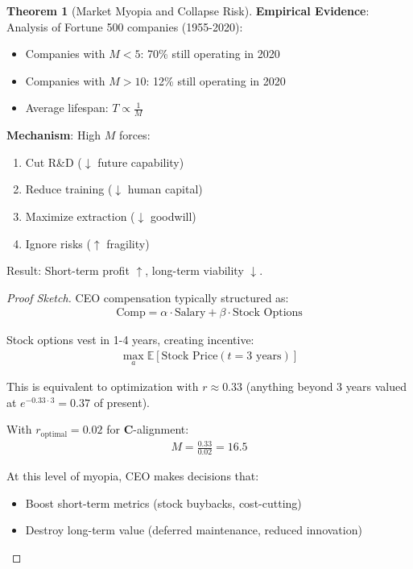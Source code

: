 \documentclass[11pt,a4paper]{article}
\theoremstyle{definition}
\newtheorem{theorem}{Theorem}[section]
\theoremstyle{remark}
\begin{document}
\begin{enumerate}
\begin{theorem}[Market Myopia and Collapse Risk]
\textbf{Empirical Evidence}: Analysis of Fortune 500 companies (1955-2020):
\begin{itemize}
    \item Companies with \(M < 5\): 70\% still operating in 2020
    \item Companies with \(M > 10\): 12\% still operating in 2020
    \item Average lifespan: \(T \propto \frac{1}{M}\)
\end{itemize}

\textbf{Mechanism}: High \(M\) forces:
\begin{enumerate}
    \item Cut R\&D (\(\downarrow\) future capability)
    \item Reduce training (\(\downarrow\) human capital)
    \item Maximize extraction (\(\downarrow\) goodwill)
    \item Ignore risks (\(\uparrow\) fragility)
\end{enumerate}

Result: Short-term profit \(\uparrow\), long-term viability \(\downarrow\).
\end{theorem}

\begin{proof}[Proof Sketch]
CEO compensation typically structured as:
\begin{align}
\text{Comp} = \alpha \cdot \text{Salary} + \beta \cdot \text{Stock Options}
\end{align}

Stock options vest in 1-4 years, creating incentive:
\begin{align}
\max_{a} \mathbb{E}[\text{Stock Price}(t = 3 \text{ years})]
\end{align}

This is equivalent to optimization with \(r \approx 0.33\) (anything beyond 3 years valued at \(e^{-0.33 \cdot 3} = 0.37\) of present).

With \(r_{\text{optimal}} = 0.02\) for \(\mathbf{C}\)-alignment:
\begin{align}
M = \frac{0.33}{0.02} = 16.5
\end{align}

At this level of myopia, CEO makes decisions that:
\begin{itemize}
    \item Boost short-term metrics (stock buybacks, cost-cutting)
    \item Destroy long-term value (deferred maintenance, reduced innovation)
\end{itemize}


\end{proof}
\end{enumerate}
\end{document}
